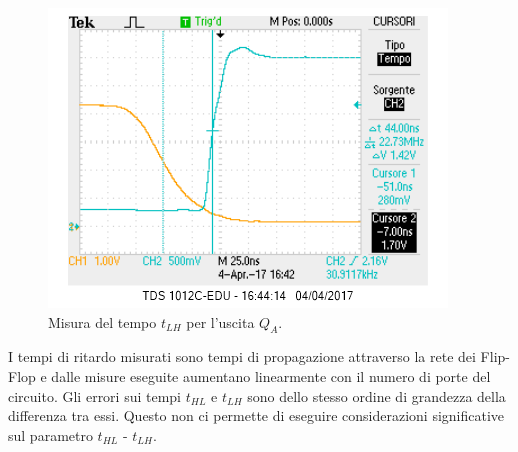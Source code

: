 \documentclass[10pt,a4paper]{article}
\begin{document}
\begin{figure}
\centering
\includegraphics[scale=1.0]{tplhQA.png}
\caption{Misura del tempo $t_{LH}$ per l'uscita $Q_A$.\label{qa2}}
\end{figure}



I tempi di ritardo misurati sono tempi di propagazione attraverso la rete dei Flip-Flop e dalle misure eseguite aumentano linearmente con il numero di porte del circuito. Gli errori sui tempi $t_{HL}$ e $t_{LH}$ sono dello stesso ordine di grandezza della differenza tra essi. Questo non ci permette di eseguire considerazioni significative sul parametro $t_{HL}$ - $t_{LH}$.\\
\end{document}
